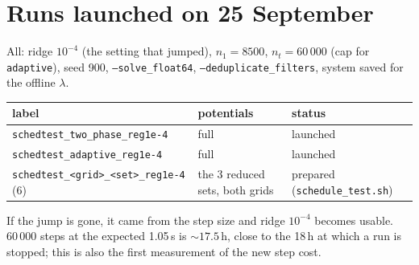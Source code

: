 \documentclass[11pt,a4paper]{article}
\newcommand{\code}[1]{\texttt{#1}}
\begin{document}
\section{Runs launched on 25 September}\label{sec:launch25}\nopagebreak
All: ridge $10^{-4}$ (the setting that jumped), $n_1=8500$, $n_t=60\,000$ (cap for \code{adaptive}),
seed 900, \code{--solve\_float64}, \code{--deduplicate\_filters}, system saved for the offline $\lambda$.
\begin{center}\small
\begin{tabular}{@{}lll@{}}
\toprule
label & potentials & status\\
\midrule
\code{schedtest\_two\_phase\_reg1e-4} & full & launched\\
\code{schedtest\_adaptive\_reg1e-4} & full & launched\\
\code{schedtest\_<grid>\_<set>\_reg1e-4} (6) & the 3 reduced sets, both grids & prepared (\code{schedule\_test.sh})\\
\bottomrule
\end{tabular}
\end{center}
If the jump is gone, it came from the step size and ridge $10^{-4}$ becomes usable. $60\,000$ steps
at the expected 1.05\,s is $\sim17.5$\,h, close to the 18\,h at which a run is stopped; this is also
the first measurement of the new step cost.
\end{document}
